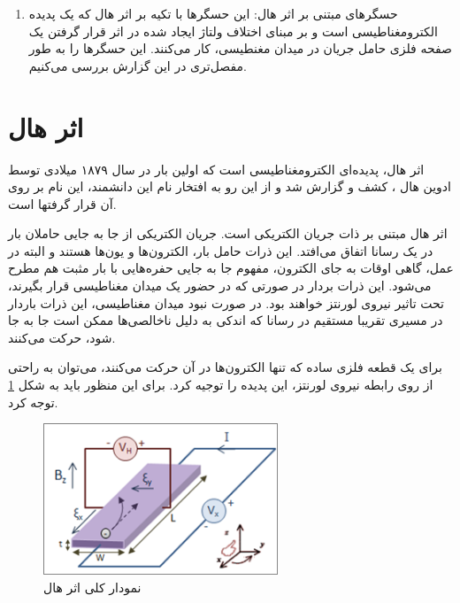 \documentclass[conference]{IEEEtran-ModifiedForMVIP}
\begin{document}
\begin{enumerate}
		

	
	\item
	حسگر‌های مبتنی بر اثر هال:
	این حسگر‌ها با تکیه بر اثر هال که یک پدیده الکترومغناطیسی است و بر مبنای اختلاف ولتاژ ایجاد شده در اثر قرار گرفتن یک صفحه فلزی حامل جریان در میدان مغنطیسی، کار می‌کنند. این حسگر‌ها را به طور مفصل‌تری در این گزارش بررسی می‌کنیم.
	
	
	
	
\end{enumerate}


\section{اثر هال}

اثر هال، پدیده‌ای الکترومغناطیسی است که اولین بار در سال ۱۸۷۹ میلادی توسط ادوین هال
، کشف و گزارش شد و از این رو به افتخار نام این دانشمند، این نام بر روی آن قرار گرفتها است. \cite{noauthor_hall_2021}

اثر هال مبتنی بر ذات جریان الکتریکی است. جریان الکتریکی از جا به جایی حاملان بار در یک رسانا اتفاق می‌افتد. این ذرات حامل بار، الکترون‌ها و یون‌ها هستند و البته در عمل، گاهی‌ اوقات به جای الکترون، مفهوم جا به جایی حفره‌هایی با بار مثبت هم مطرح می‌شود. این ذرات بردار در صورتی که در حضور یک میدان مغناطیسی  قرار بگیرند، تحت تاثیر نیروی لورنتز خواهند بود. در صورت نبود میدان مغناطیسی، این ذرات باردار در مسیری تقریبا مستقیم در رسانا که اندکی به دلیل ناخالصی‌ها ممکن است جا به جا شود، حرکت می‌کنند.

برای یک قطعه فلزی ساده که تنها الکترون‌ها در آن حرکت می‌کنند، می‌توان به راحتی از روی رابطه نیروی لورنتز‌، این پدیده را توجیه کرد. برای این منظور باید به شکل \ref{fig:hall} توجه کرد.



\begin{figure}[t]

	\centering 
	\includegraphics[width=70mm]{Images/fig1.png}
	\caption{نمودار کلی اثر هال 
\cite{noauthor_hall_2021}	
}\label{fig:hall}
\end{figure}
\end{document}

